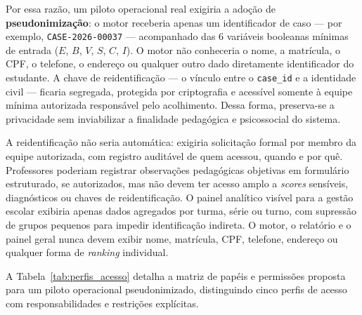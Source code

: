 \documentclass[
    12pt,
    openright,
    oneside,
    a4paper,
    english,
    brazil
]{abntex2}
\begin{document}
Por essa raz\~ao, um piloto operacional real exigiria a ado\c{c}\~ao de \textbf{pseudonimiza\c{c}\~ao}: o motor receberia apenas um identificador de caso --- por exemplo, \texttt{CASE-2026-00037} --- acompanhado das 6 vari\'aveis booleanas m\'inimas de entrada ($E$, $B$, $V$, $S$, $C$, $I$). O motor n\~ao conheceria o nome, a matr\'icula, o CPF, o telefone, o endere\c{c}o ou qualquer outro dado diretamente identificador do estudante. A chave de reidentifica\c{c}\~ao --- o v\'inculo entre o \texttt{case\_id} e a identidade civil --- ficaria segregada, protegida por criptografia e acess\'ivel somente \`a equipe m\'inima autorizada respons\'avel pelo acolhimento. Dessa forma, preserva-se a privacidade sem inviabilizar a finalidade pedag\'ogica e psicossocial do sistema.

A reidentifica\c{c}\~ao n\~ao seria autom\'atica: exigiria solicita\c{c}\~ao formal por membro da equipe autorizada, com registro audit\'avel de quem acessou, quando e por qu\^e. Professores poderiam registrar observa\c{c}\~oes pedag\'ogicas objetivas em formul\'ario estruturado, se autorizados, mas n\~ao devem ter acesso amplo a \textit{scores} sens\'iveis, diagn\'osticos ou chaves de reidentifica\c{c}\~ao. O painel anal\'itico vis\'ivel para a gest\~ao escolar exibiria apenas dados agregados por turma, s\'erie ou turno, com supress\~ao de grupos pequenos para impedir identifica\c{c}\~ao indireta. O motor, o relat\'orio e o painel geral nunca devem exibir nome, matr\'icula, CPF, telefone, endere\c{c}o ou qualquer forma de \textit{ranking} individual.

A Tabela~\ref{tab:perfis_acesso} detalha a matriz de pap\'eis e permiss\~oes proposta para um piloto operacional pseudonimizado, distinguindo cinco perfis de acesso com responsabilidades e restri\c{c}\~oes expl\'icitas.
\end{document}
